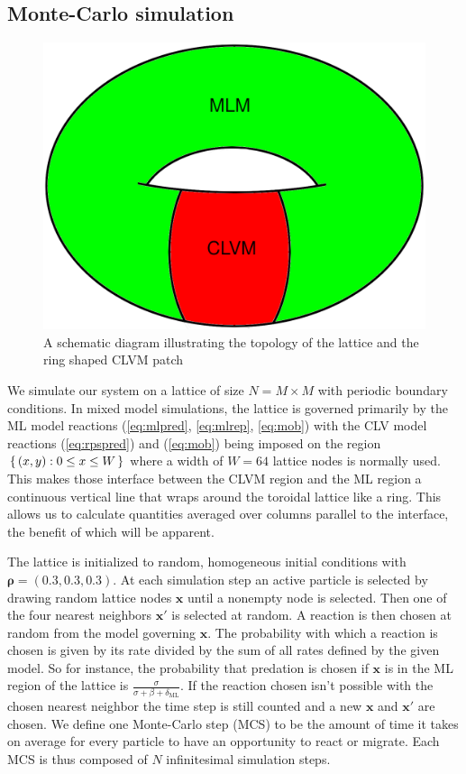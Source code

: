 \documentclass[12pt]{article}
\begin{document}
\subsection{Monte-Carlo simulation}%
\label{sub:monte_carlo_simulation}

\begin{figure}[h]
    \centering
    \includegraphics[width=0.5\linewidth]{images/Model_Illustration.png} 
    \caption{A schematic diagram illustrating the topology of the lattice and the ring shaped CLVM patch} \label{fig:schematic}
\end{figure}

We simulate our system on a lattice of size $ N = M \times M $  with periodic boundary conditions. 
In mixed model simulations, the lattice is governed primarily by the ML model reactions (\ref{eq:mlpred}, \ref{eq:mlrep}, \ref{eq:mob}) 
with the CLV model reactions (\ref{eq:rpspred}) and (\ref{eq:mob})  being imposed on the region 
$ \set{(x,y): 0\leq x\leq W} $ where a width of $ W = 64$ lattice nodes is normally used.
This makes those interface between the CLVM region and the ML region a continuous vertical line that wraps around the 
toroidal lattice like a ring. This allows us to calculate quantities averaged over columns parallel to the interface, 
the benefit of which will be apparent. 

The lattice is initialized to random, homogeneous initial conditions with $ \bm{\rho} = (0.3,0.3,0.3) $. At each simulation step
an active particle is selected by drawing random lattice nodes $ \bm{x} $ until a nonempty node is selected. Then one of the
four nearest neighbors $ \bm{x}' $ is selected at random. A reaction is then chosen at random from the model governing $ \bm{x} $. 
The probability with which a reaction is chosen is given by its rate divided by the sum of all rates defined by the given model.
So for instance, the probability that predation is chosen if $ \bm{x} $ is in the ML region of the lattice is 
$ \frac{\sigma}{\sigma + \beta + \delta_{\mathrm{ML}}}  $. 
If the reaction chosen isn't possible with the chosen nearest neighbor the time step is still counted and a new 
$ \bm{x} $ and $ \bm{x}' $ are chosen. We define one Monte-Carlo step (MCS) to be the amount of time it takes on average for 
every particle to have an opportunity to react or migrate. Each MCS is thus composed of $ N $ infinitesimal simulation steps.
\end{document}
